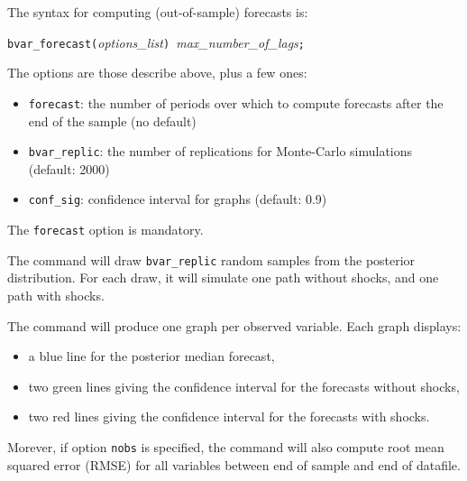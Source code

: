 \documentclass[11pt,a4paper]{article}
\begin{document}
The syntax for computing (out-of-sample) forecasts is:

\medskip
\texttt{bvar\_forecast(}\textit{options\_list}\texttt{) }\textit{max\_number\_of\_lags}\texttt{;}
\medskip

The options are those describe above, plus a few ones:
\begin{itemize}
\item \texttt{forecast}: the number of periods over which to compute forecasts after the end of the sample (no default)
\item \texttt{bvar\_replic}: the number of replications for Monte-Carlo simulations (default: 2000)
\item \texttt{conf\_sig}: confidence interval for graphs (default: 0.9)
\end{itemize}

The \texttt{forecast} option is mandatory.

The command will draw \texttt{bvar\_replic} random samples from the posterior distribution. For each draw, it will simulate one path without shocks, and one path with shocks.


The command will produce one graph per observed variable. Each graph displays:
\begin{itemize}
\item a blue line for the posterior median forecast,%
\item two green lines giving the confidence interval for the forecasts without shocks,
\item two red lines giving the confidence interval for the forecasts with shocks.
\end{itemize}

Morever, if option \texttt{nobs} is specified, the command will also compute root mean squared error (RMSE) for all variables between end of sample and end of datafile.
\end{document}
